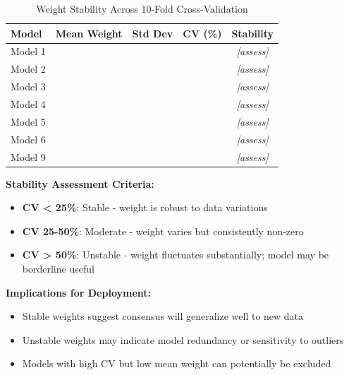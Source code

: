 \begin{table}[ht]
\centering
\caption{Weight Stability Across 10-Fold Cross-Validation}
\label{tab:model11_weight_stability}
\begin{tabular}{lcccc}
\toprule
\textbf{Model} & \textbf{Mean Weight} & \textbf{Std Dev} & \textbf{CV (\%)} & \textbf{Stability} \\
\midrule
Model 1 & \ModelElevenWeightOne{} & \ModelElevenWeightStdOne{} & \ModelElevenWeightCVOne{} & \textit{[assess]} \\
Model 2 & \ModelElevenWeightTwo{} & \ModelElevenWeightStdTwo{} & \ModelElevenWeightCVTwo{} & \textit{[assess]} \\
Model 3 & \ModelElevenWeightThree{} & \ModelElevenWeightStdThree{} & \ModelElevenWeightCVThree{} & \textit{[assess]} \\
Model 4 & \ModelElevenWeightFour{} & \ModelElevenWeightStdFour{} & \ModelElevenWeightCVFour{} & \textit{[assess]} \\
Model 5 & \ModelElevenWeightFive{} & \ModelElevenWeightStdFive{} & \ModelElevenWeightCVFive{} & \textit{[assess]} \\
Model 6 & \ModelElevenWeightSix{} & \ModelElevenWeightStdSix{} & \ModelElevenWeightCVSix{} & \textit{[assess]} \\
Model 9 & \ModelElevenWeightNine{} & \ModelElevenWeightStdNine{} & \ModelElevenWeightCVNine{} & \textit{[assess]} \\
\bottomrule
\end{tabular}
\end{table}

\textbf{Stability Assessment Criteria:}
\begin{itemize}
    \item \textbf{CV < 25\%}: Stable - weight is robust to data variations
    \item \textbf{CV 25-50\%}: Moderate - weight varies but consistently non-zero
    \item \textbf{CV > 50\%}: Unstable - weight fluctuates substantially; model may be borderline useful
\end{itemize}

\textbf{Implications for Deployment:}
\begin{itemize}
    \item Stable weights suggest consensus will generalize well to new data
    \item Unstable weights may indicate model redundancy or sensitivity to outliers
    \item Models with high CV but low mean weight can potentially be excluded
\end{itemize}

